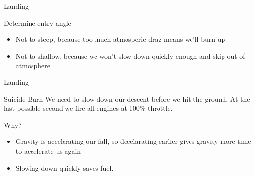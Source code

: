{
%
\begin{frame}
\end{frame}
\begin{frame}[t]{Landing}
    \begin{block}{Determine entry angle}
        \begin{itemize}
            \item Not to steep, because too much atmosperic drag means we'll burn up
            \item Not to shallow, because we won't slow down quickly enough and skip out of atmosphere
        \end{itemize}
    \end{block}
\end{frame}
\begin{frame}[t]{Landing}
    \begin{block}{Suicide Burn}
        We need to slow down our descent before we hit the ground. At the last possible second we fire all engines at 100\% throttle.
    \end{block}
    \begin{block}{Why?}
        \begin{itemize}
            \item Gravity is accelerating our fall, so decelarating earlier gives gravity more time to accelerate us again
            \item Slowing down quickly saves fuel.
        \end{itemize}
    \end{block}
\end{frame}
}
